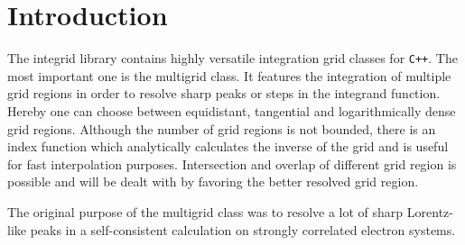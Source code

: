 \chapter{Introduction}

The integrid library contains highly versatile integration grid classes for \texttt{C++}. The most important one is the multigrid class. It features the integration of multiple grid regions in order to resolve sharp peaks or steps in the integrand function. Hereby one can choose between equidistant, tangential and logarithmically dense grid regions. Although the number of grid regions is not bounded, there is an index function which analytically calculates the inverse of the grid and is useful for fast interpolation purposes. Intersection and overlap of different grid region is possible and will be dealt with by favoring the better resolved grid region.

The original purpose of the multigrid class was to resolve a lot of sharp Lorentz-like peaks in a self-consistent calculation on strongly correlated electron systems.

